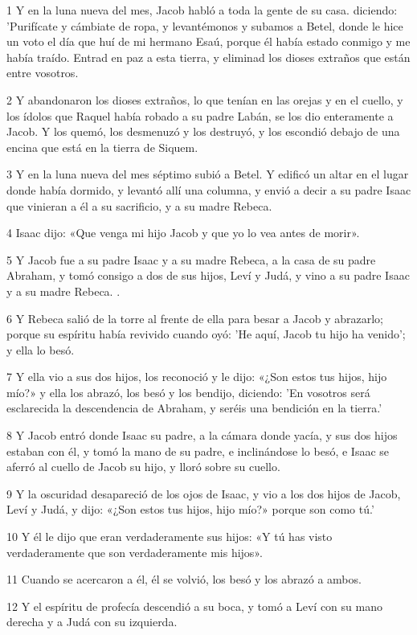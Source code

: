 \par 1 Y en la luna nueva del mes, Jacob habló a toda la gente de su casa. diciendo: 'Purifícate y cámbiate de ropa, y levantémonos y subamos a Betel, donde le hice un voto el día que huí de mi hermano Esaú, porque él había estado conmigo y me había traído. Entrad en paz a esta tierra, y eliminad los dioses extraños que están entre vosotros.
\par 2 Y abandonaron los dioses extraños, lo que tenían en las orejas y en el cuello, y los ídolos que Raquel había robado a su padre Labán, se los dio enteramente a Jacob. Y los quemó, los desmenuzó y los destruyó, y los escondió debajo de una encina que está en la tierra de Siquem.
\par 3 Y en la luna nueva del mes séptimo subió a Betel. Y edificó un altar en el lugar donde había dormido, y levantó allí una columna, y envió a decir a su padre Isaac que vinieran a él a su sacrificio, y a su madre Rebeca.
\par 4 Isaac dijo: «Que venga mi hijo Jacob y que yo lo vea antes de morir».
\par 5 Y Jacob fue a su padre Isaac y a su madre Rebeca, a la casa de su padre Abraham, y tomó consigo a dos de sus hijos, Leví y Judá, y vino a su padre Isaac y a su madre Rebeca. .
\par 6 Y Rebeca salió de la torre al frente de ella para besar a Jacob y abrazarlo; porque su espíritu había revivido cuando oyó: 'He aquí, Jacob tu hijo ha venido'; y ella lo besó.
\par 7 Y ella vio a sus dos hijos, los reconoció y le dijo: «¿Son estos tus hijos, hijo mío?» y ella los abrazó, los besó y los bendijo, diciendo: 'En vosotros será esclarecida la descendencia de Abraham, y seréis una bendición en la tierra.'
\par 8 Y Jacob entró donde Isaac su padre, a la cámara donde yacía, y sus dos hijos estaban con él, y tomó la mano de su padre, e inclinándose lo besó, e Isaac se aferró al cuello de Jacob su hijo, y lloró sobre su cuello.
\par 9 Y la oscuridad desapareció de los ojos de Isaac, y vio a los dos hijos de Jacob, Leví y Judá, y dijo: «¿Son estos tus hijos, hijo mío?» porque son como tú.'
\par 10 Y él le dijo que eran verdaderamente sus hijos: «Y tú has visto verdaderamente que son verdaderamente mis hijos».
\par 11 Cuando se acercaron a él, él se volvió, los besó y los abrazó a ambos.
\par 12 Y el espíritu de profecía descendió a su boca, y tomó a Leví con su mano derecha y a Judá con su izquierda.
